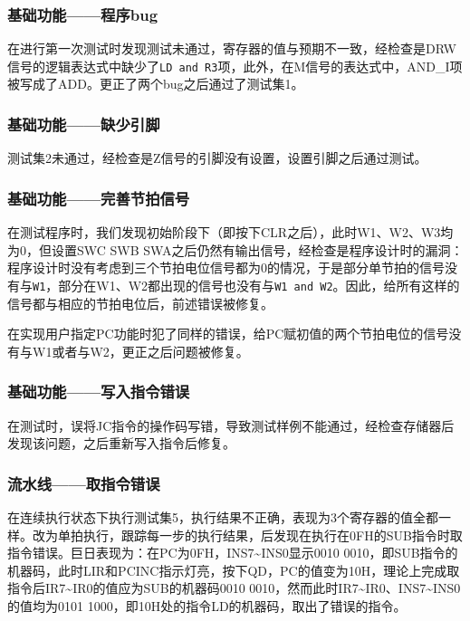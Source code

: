 \documentclass[lang=cn,11pt,a4paper,cite=authornum]{paper}
\begin{document}
\subsubsection{基础功能——程序bug}

在进行第一次测试时发现测试未通过，寄存器的值与预期不一致，经检查是DRW信号的逻辑表达式中缺少了\texttt{LD and R3}项，此外，在M信号的表达式中，AND\_I项被写成了ADD。更正了两个bug之后通过了测试集1。

\subsubsection{基础功能——缺少引脚}

测试集2未通过，经检查是Z信号的引脚没有设置，设置引脚之后通过测试。

\subsubsection{基础功能——完善节拍信号}

在测试程序时，我们发现初始阶段下（即按下CLR之后），此时W1、W2、W3均为0，但设置SWC SWB SWA之后仍然有输出信号，经检查是程序设计时的漏洞：程序设计时没有考虑到三个节拍电位信号都为0的情况，于是部分单节拍的信号没有与\texttt{W1}，部分在W1、W2都出现的信号也没有与\texttt{W1 and W2}。因此，给所有这样的信号都与相应的节拍电位后，前述错误被修复。

在实现用户指定PC功能时犯了同样的错误，给PC赋初值的两个节拍电位的信号没有与W1或者与W2，更正之后问题被修复。

\subsubsection{基础功能——写入指令错误}

在测试时，误将JC指令的操作码写错，导致测试样例不能通过，经检查存储器后发现该问题，之后重新写入指令后修复。

\subsubsection{流水线——取指令错误}

在连续执行状态下执行测试集5，执行结果不正确，表现为3个寄存器的值全都一样。改为单拍执行，跟踪每一步的执行结果，后发现在执行在0FH的SUB指令时取指令错误。巨日表现为：在PC为0FH，INS7\textasciitilde INS0显示0010 0010，即SUB指令的机器码，此时LIR和PCINC指示灯亮，按下QD，PC的值变为10H，理论上完成取指令后IR7\textasciitilde IR0的值应为SUB的机器码0010 0010，然而此时IR7\textasciitilde IR0、INS7\textasciitilde INS0的值均为0101 1000，即10H处的指令LD的机器码，取出了错误的指令。
\end{document}
